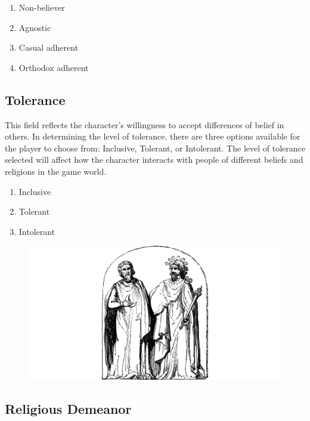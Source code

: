 \documentclass[12pt]{book}
\begin{document}
\begin{enumerate}
    \item Non-believer
    \item Agnostic
    \item Casual adherent
    \item Orthodox adherent
\end{enumerate}

\subsection{\textbf{Tolerance}}

This field reflects the character's willingness to accept differences of belief in others. In determining the level of tolerance, there are three options available for the player to choose from: Inclusive, Tolerant, or Intolerant. The level of tolerance selected will affect how the character interacts with people of different beliefs and religions in the game world.

\begin{enumerate}
    \item Inclusive
    \item Tolerant
    \item Intolerant
\end{enumerate}

\begin{figure}[h]
    \centering
    \includegraphics[width=\textwidth]{./images/religion03.pdf}
\end{figure}

\subsection{\textbf{Religious Demeanor}}
\end{document}

